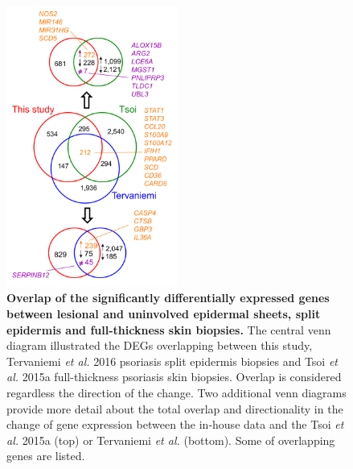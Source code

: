 
\begin{figure}[ht]
\centering
\includegraphics[width=0.5\textwidth]{./Results2/pdfs/skin_transcriptomics_venn_diagrams_with_genes}
\caption[Overlap of the significantly differentially expressed genes between lesional and uninvolved epidermal sheets, split epidermis and full-thickness skin biopsies.]{\textbf{Overlap of the significantly differentially expressed genes between lesional and uninvolved epidermal sheets, split epidermis and full-thickness skin biopsies.} The central venn diagram illustrated the DEGs overlapping between this study, Tervaniemi \textit{et al.} 2016 psoriasis split epidermis biopsies and Tsoi \textit{et al.} 2015a full-thickness psoriasis skin biopsies. Overlap is considered regardless the direction of the change. Two additional venn diagrams provide more detail about the total overlap and directionality in the change of gene expression between the in-house data and the Tsoi \textit{et al.} 2015a (top) or Tervaniemi \textit{et al.} (bottom). Some of overlapping genes are listed.}
\label{figure:Skin_venn_diagrams_comparison_other_studies}
\end{figure}





